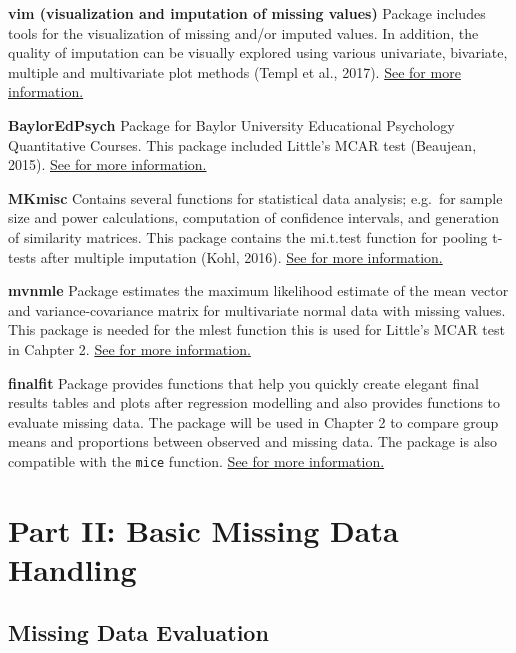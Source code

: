 \documentclass[
]{book}
\begin{document}
\textbf{vim (visualization and imputation of missing values)}
Package includes tools for the visualization of missing and/or imputed values. In addition, the quality of imputation can be visually explored using various univariate, bivariate, multiple and multivariate plot methods (Templ et al., 2017).
\href{https://cran.r-project.org/web/packages/mi/index.html}{See for more information.}

\textbf{BaylorEdPsych}
Package for Baylor University Educational Psychology Quantitative Courses. This package included Little's MCAR test (Beaujean, 2015).
\href{https://cran.r-project.org/web/packages/BaylorEdPsych/index.html}{See for more information.}

\textbf{MKmisc}
Contains several functions for statistical data analysis; e.g.~for sample size and power calculations, computation of confidence intervals, and generation of similarity matrices. This package contains the mi.t.test function for pooling t-tests after multiple imputation (Kohl, 2016).
\href{https://cran.r-project.org/web/packages/MKmisc/index.html}{See for more information.}

\textbf{mvnmle}
Package estimates the maximum likelihood estimate of the mean vector and variance-covariance matrix for multivariate normal data with missing values. This package is needed for the mlest function this is used for Little's MCAR test in Cahpter 2.
\href{https://cran.r-project.org/web/packages/mvnmle/index.html}{See for more information.}

\textbf{finalfit}
Package provides functions that help you quickly create elegant final results tables and plots after regression modelling and also provides functions to evaluate missing data. The package will be used in Chapter 2 to compare group means and proportions between observed and missing data. The package is also compatible with the \texttt{mice} function.
\href{https://finalfit.org/index.html}{See for more information.}

\hypertarget{part-part-ii-basic-missing-data-handling}{%
\part{Part II: Basic Missing Data Handling}\label{part-part-ii-basic-missing-data-handling}}

\hypertarget{missing-data-evaluation}{%
\chapter{Missing Data Evaluation}\label{missing-data-evaluation}}
\end{document}
